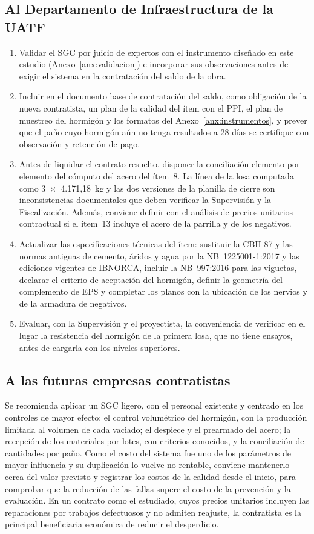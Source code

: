 \subsection{Al Departamento de Infraestructura de la UATF}
\begin{enumerate}[label=(\arabic*)]
  \item Validar el SGC por juicio de expertos con el instrumento diseñado en este estudio (Anexo~\ref{anx:validacion}) e incorporar sus observaciones antes de exigir el sistema en la contratación del saldo de la obra.
  \item Incluir en el documento base de contratación del saldo, como obligación de la nueva contratista, un plan de la calidad del ítem con el PPI, el plan de muestreo del hormigón y los formatos del Anexo~\ref{anx:instrumentos}, y prever que el paño cuyo hormigón aún no tenga resultados a 28 días se certifique con observación y retención de pago.
  \item Antes de liquidar el contrato resuelto, disponer la conciliación elemento por elemento del cómputo del acero del ítem~8. La línea de la losa computada como 3~$\times$~4.171,18~kg y las dos versiones de la planilla de cierre son inconsistencias documentales que deben verificar la Supervisión y la Fiscalización. Además, conviene definir con el análisis de precios unitarios contractual si el ítem~13 incluye el acero de la parrilla y de los negativos.
  \item Actualizar las especificaciones técnicas del ítem: sustituir la CBH-87 y las normas antiguas de cemento, áridos y agua por la NB~1225001-1:2017 y las ediciones vigentes de IBNORCA, incluir la NB~997:2016 para las viguetas, declarar el criterio de aceptación del hormigón, definir la geometría del complemento de EPS y completar los planos con la ubicación de los nervios y de la armadura de negativos.
  \item Evaluar, con la Supervisión y el proyectista, la conveniencia de verificar en el lugar la resistencia del hormigón de la primera losa, que no tiene ensayos, antes de cargarla con los niveles superiores.
\end{enumerate}

\subsection{A las futuras empresas contratistas}
Se recomienda aplicar un SGC ligero, con el personal existente y centrado en los controles de mayor efecto: el control volumétrico del hormigón, con la producción limitada al volumen de cada vaciado; el despiece y el prearmado del acero; la recepción de los materiales por lotes, con criterios conocidos, y la conciliación de cantidades por paño. Como el costo del sistema fue uno de los parámetros de mayor influencia y su duplicación lo vuelve no rentable, conviene mantenerlo cerca del valor previsto y registrar los costos de la calidad desde el inicio, para comprobar que la reducción de las fallas supere el costo de la prevención y la evaluación. En un contrato como el estudiado, cuyos precios unitarios incluyen las reparaciones por trabajos defectuosos y no admiten reajuste, la contratista es la principal beneficiaria económica de reducir el desperdicio.


